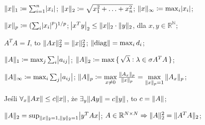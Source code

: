

\entry
$\|x\|_1 \coloneqq \sum^n_{i=1}\abs{x_i}$;
\entry
$\|x\|_2 \coloneqq \sqrt{x_1^2+\ldots + x_n^2}$;
\entry
$\|x\|_\infty \coloneqq \max_{i}\abs{x_i}$;

\entry
$\|x\|_p \coloneqq (\sum_i\abs{x_i}^p)^{1/p}$;
\entry
$\abs{x^Ty}_2 \leq \|x\|_2\cdot\|y\|_2$, dla $x,y\in\mathbb{R^N}$;

\entry
$A^TA=I$, to $\|Ax\|^2_2=\|x\|^2_2$;
\entry
$\|\mathrm{diag}\| = \max_i d_i$;



\entry
$\|A\|_1 \coloneqq \max_j\sum_i\abs{a_{ij}}$;
\entry
$\|A\|_2 \coloneqq \max\set{\sqrt{\lambda} : \lambda \in \sigma{A^TA}}$;

\entry
$\|A\|_\infty \coloneqq \max_i\sum_j\abs{a_{ij}}$;
\entry
$\|A\|_p \coloneqq \max\limits_{x\neq 0} \frac{\|A_x\|_p}{\|x\|_p} = \max\limits_{\|x\|_p = 1} \|A_x\|_p$;

\entry
Jeśli $\forall_{x} \|Ax\|\leq c\|x\|$, że $\exists_y \|Ay\| = c\|y\|$, to $c=\|A\|$;

\entry
$\|A\|_2 = \sup_{\|x\|_2=1, \|y\|_2=1}\abs{y^TAx}$;
\entry
$A\in\mathbb{R}^{N\times N} \Rightarrow \|A\|^2_2=\|A^TA\|_2$;


